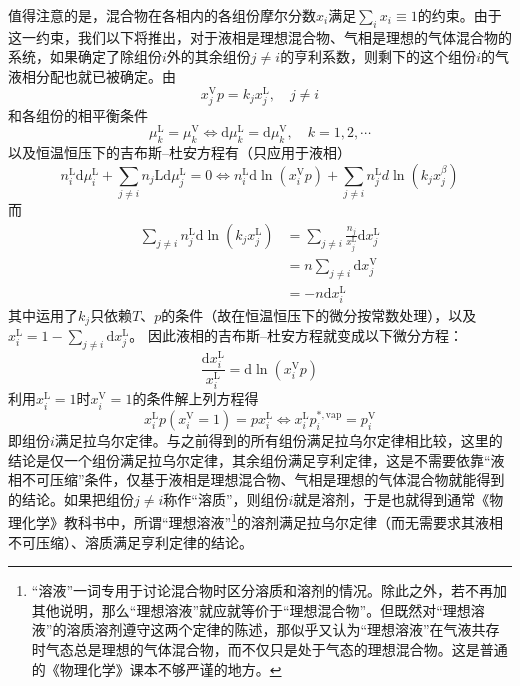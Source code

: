 \documentclass[main.tex]{subfiles}
\begin{document}
值得注意的是，混合物在各相内的各组份摩尔分数$x_i$满足$\sum_ix_i\equiv 1$的约束。由于这一约束，我们以下将推出，对于液相是理想混合物、气相是理想的气体混合物的系统，如果确定了除组份$i$外的其余组份$j\neq i$的亨利系数，则剩下的这个组份$i$的气液相分配也就已被确定。由
\[x_j^\text{V}p=k_jx_j^\text{L},\quad j\neq i\]
和各组份的相平衡条件
\[\mu_k^\text{L}=\mu_k^\text{V}\Leftrightarrow \mathrm{d}\mu_k^\text{L}=\mathrm{d}\mu_k^\text{V},\quad k=1,2,\cdots\]
以及恒温恒压下的吉布斯--杜安方程有（只应用于液相）
\[
  n_i^\text{L}\mathrm{d}\mu_i^\text{L}+\sum_{j\neq i}n_j\text{L}\mathrm{d}\mu_j^\text{L}=0\Leftrightarrow n_i^\text{L}\mathrm{d}\ln\left(x_i^\text{V}p\right)+\sum_{j\neq i}n_j^\text{L}d\ln\left(k_jx_j^\beta\right)
\]
而
\begin{align*}
  \sum_{j\neq i}n_j^\text{L}\mathrm{d}\ln\left(k_j x_j^\text{L}\right) & =\sum_{j\neq i}\frac{n_j}{x_j^\text{L}}\mathrm{d}x_j^\text{L} \\
                                                                       & =n\sum_{j\neq i}\mathrm{d}x_j^\text{V}                        \\
                                                                       & =-n\mathrm{d}x_i^\text{L}
\end{align*}
其中运用了$k_j$只依赖$T$、$p$的条件（故在恒温恒压下的微分按常数处理），以及$x_i^\text{L}=1-\sum_{j\neq i}\mathrm{d}x_j^\text{L}$。
因此液相的吉布斯--杜安方程就变成以下微分方程：
\[\frac{\mathrm{d}x_i^\text{L}}{x_i^\text{L}}=\mathrm{d}\ln\left(x_i^\text{V}p\right)\]
利用$x_i^\text{L}=1$时$x_i^\text{V}=1$的条件解上列方程得
\[x_i^\text{L}p\left(x_i^\text{V}= 1\right)=p x_i^\text{L}\Leftrightarrow x_i^\text{L}p_i^{*,\text{vap}}=p^\text{V}_i\]
即组份$i$满足拉乌尔定律。与之前得到的所有组份满足拉乌尔定律相比较，这里的结论是仅一个组份满足拉乌尔定律，其余组份满足亨利定律，这是不需要依靠“液相不可压缩”条件，仅基于液相是理想混合物、气相是理想的气体混合物就能得到的结论。如果把组份$j\neq i$称作“溶质”，则组份$i$就是溶剂，于是也就得到通常《物理化学》教科书中，所谓“理想溶液”\footnote{“溶液”一词专用于讨论混合物时区分溶质和溶剂的情况。除此之外，若不再加其他说明，那么“理想溶液”就应就等价于“理想混合物”。但既然对“理想溶液”的溶质溶剂遵守这两个定律的陈述，那似乎又认为“理想溶液”在气液共存时气态总是理想的气体混合物，而不仅只是处于气态的理想混合物。这是普通的《物理化学》课本不够严谨的地方。}的溶剂满足拉乌尔定律（而无需要求其液相不可压缩）、溶质满足亨利定律的结论。
\end{document}
